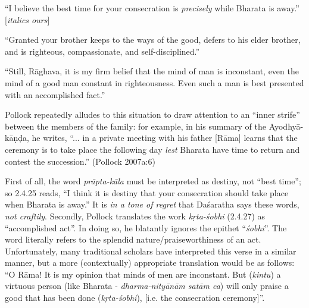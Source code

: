\begin{myquote}
“I believe the best time for your consecration is {\sl precisely} while Bharata is away.” [{\sl italics ours}]
								 	 
“Granted your brother keeps to the ways of the good, defers to his elder brother, and is righteous, compassionate, and self-disciplined.”
		 
“Still, Rāghava, it is my firm belief that the mind of man is inconstant, even the mind of a good man constant in righteousness. Even such a man is best presented with an accomplished fact.”	
\end{myquote}

Pollock repeatedly alludes to this situation to draw attention to an “inner strife” between the members of the family: for example, in his summary of the Ayodhyā-kāṇḍa, he writes, “... in a private meeting with his father [Rāma] learns that the ceremony is to take place the following day {\sl lest} Bharata have time to return and contest the succession.” (Pollock 2007a:6)

First of all, the word {\sl prāpta-kāla} must be interpreted as destiny, not “best time”; so 2.4.25 reads, “I think it is destiny that your consecration should take place when Bharata is away.” It is {\sl in a tone of regret} that Daśaratha says these words, {\sl not craftily}. Secondly, Pollock translates the work {\sl kṛta-śobhi} (2.4.27) as “accomplished act”. In doing so, he blatantly ignores the epithet “{\sl śobhi}”. The word literally refers to the splendid nature/praiseworthiness of an act. Unfortunately, many traditional scholars have interpreted this verse in a similar manner, but a more (contextually) appropriate translation would be as follows: “O Rāma! It is my opinion that minds of men are inconstant. But ({\sl kintu}) a virtuous person (like Bharata - {\sl dharma-nityānām satām ca}) will only praise a good that has been done ({\sl kṛta-śobhi}), [i.e. the consecration ceremony]”.

